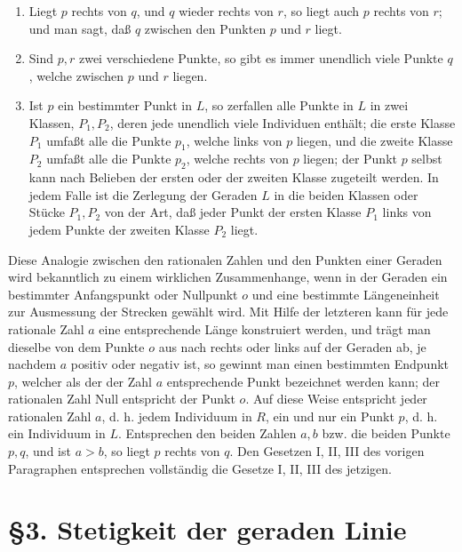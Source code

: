 \documentclass[11pt]{article}
\begin{document}
\begin{enumerate}[label=\Roman*.]
\item Liegt $p$ rechts von $q$, und $q$ wieder rechts von $r$, so liegt auch $p$ rechts von $r$; und man sagt, daß $q$ zwischen den Punkten $p$ und $r$ liegt.
\item Sind $p,r$ zwei verschiedene Punkte, so gibt es immer unendlich viele Punkte $q$, welche zwischen $p$ und $r$ liegen.
\item Ist $p$ ein bestimmter Punkt in $L$, so zerfallen alle Punkte in $L$ in zwei Klassen, $P_1,P_2$, deren jede unendlich viele Individuen enthält; die erste Klasse $P_1$ umfaßt alle die Punkte $p_1$, welche links von $p$ liegen, und die zweite Klasse $P_2$ umfaßt alle die Punkte $p_2$, welche rechts von $p$ liegen; der Punkt $p$ selbst kann nach Belieben der ersten oder der zweiten Klasse zugeteilt werden. In jedem Falle ist die Zerlegung der Geraden $L$ in die beiden Klassen oder Stücke $P_1,P_2$ von der Art, daß jeder Punkt der ersten Klasse $P_1$ links von jedem Punkte der zweiten Klasse $P_2$ liegt.
\end{enumerate}

Diese Analogie zwischen den rationalen Zahlen und den Punkten einer Geraden wird bekanntlich zu einem wirklichen Zusammenhange, wenn in der Geraden ein bestimmter Anfangspunkt oder Nullpunkt $o$ und eine bestimmte Längeneinheit zur Ausmessung der Strecken gewählt wird. Mit Hilfe der letzteren kann für jede rationale Zahl $a$ eine entsprechende Länge konstruiert werden, und trägt man dieselbe von dem Punkte $o$ aus nach rechts oder links auf der Geraden ab, je nachdem $a$ positiv oder negativ ist, so gewinnt man einen bestimmten Endpunkt $p$, welcher als der der Zahl $a$ entsprechende Punkt bezeichnet werden kann; der rationalen Zahl Null entspricht der Punkt $o$. Auf diese Weise entspricht jeder rationalen Zahl $a$, d. h. jedem Individuum in $R$, ein und nur ein Punkt $p$, d. h. ein Individuum in $L$. Entsprechen den beiden Zahlen $a,b$ bzw. die beiden Punkte $p,q$, und ist $a>b$, so liegt $p$ rechts von $q$. Den Gesetzen I, II, III des vorigen Paragraphen entsprechen vollständig die Gesetze I, II, III des jetzigen.

\section*{\S 3. Stetigkeit der geraden Linie}
\end{document}
